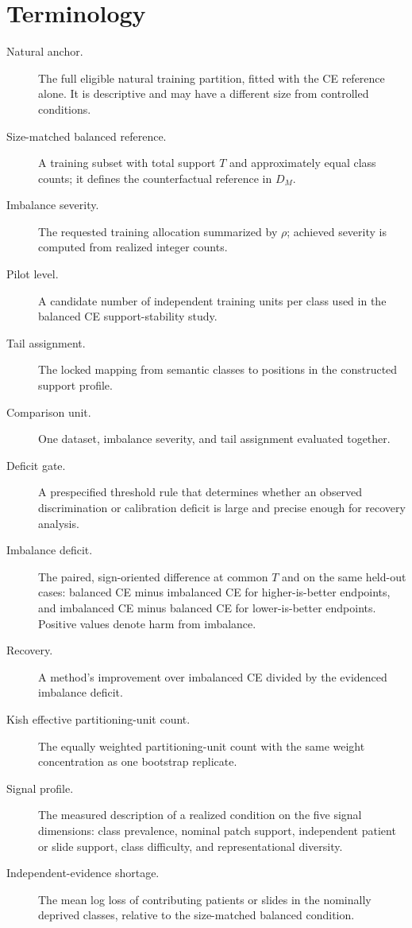 \documentclass[11pt]{article}
\begin{document}
\section{Terminology}
\label{app:terms}
\begin{description}
  \item[Natural anchor.] The full eligible natural training partition, fitted with the CE reference alone. It is descriptive and may have a different size from controlled conditions.
  \item[Size-matched balanced reference.] A training subset with total support $T$ and approximately equal class counts; it defines the counterfactual reference in $D_M$.
  \item[Imbalance severity.] The requested training allocation summarized by $\rho$; achieved severity is computed from realized integer counts.
  \item[Pilot level.] A candidate number of independent training units per class used in the balanced CE support-stability study.
  \item[Tail assignment.] The locked mapping from semantic classes to positions in the constructed support profile.
  \item[Comparison unit.] One dataset, imbalance severity, and tail assignment evaluated together.
  \item[Deficit gate.] A prespecified threshold rule that determines whether an observed discrimination or calibration deficit is large and precise enough for recovery analysis.
  \item[Imbalance deficit.] The paired, sign-oriented difference at common $T$ and on the same held-out cases: balanced CE minus imbalanced CE for higher-is-better endpoints, and imbalanced CE minus balanced CE for lower-is-better endpoints. Positive values denote harm from imbalance.
  \item[Recovery.] A method's improvement over imbalanced CE divided by the evidenced imbalance deficit.
  \item[Kish effective partitioning-unit count.] The equally weighted partitioning-unit count with the same weight concentration as one bootstrap replicate.
  \item[Signal profile.] The measured description of a realized condition on the five signal dimensions: class prevalence, nominal patch support, independent patient or slide support, class difficulty, and representational diversity.
  \item[Independent-evidence shortage.] The mean log loss of contributing patients or slides in the nominally deprived classes, relative to the size-matched balanced condition.

\end{description}
\end{document}
